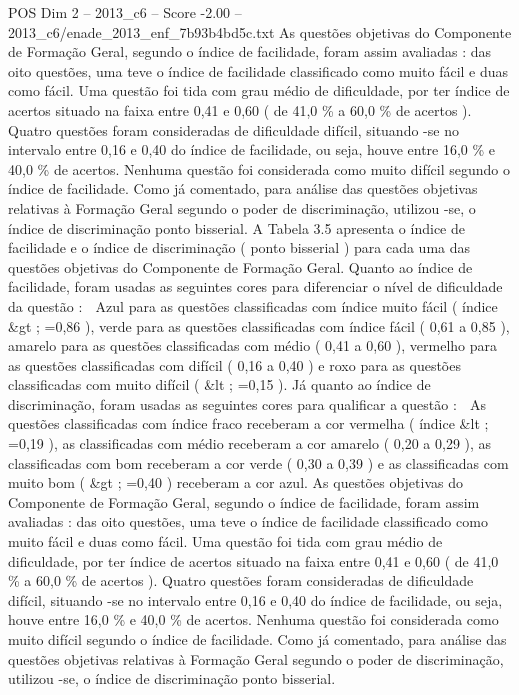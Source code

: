 \begin{textsample}{POS Dim 2 – 2013\_c6 – Score -2.00 – 2013\_c6/enade\_2013\_enf\_7b93b4bd5c.txt}
As questões objetivas do Componente de Formação Geral, segundo o índice de facilidade, foram assim avaliadas : das oito questões, uma teve o índice de facilidade classificado como muito fácil e duas como fácil.
Uma questão foi tida com grau médio de dificuldade, por ter índice de acertos situado na faixa entre 0,41 e 0,60 ( de 41,0 \% a 60,0 \% de acertos ).
Quatro questões foram consideradas de dificuldade difícil, situando -se no intervalo entre 0,16 e 0,40 do índice de facilidade, ou seja, houve entre 16,0 \% e 40,0 \% de acertos.
Nenhuma questão foi considerada como muito difícil segundo o índice de facilidade.
Como já comentado, para análise das questões objetivas relativas à Formação Geral segundo o poder de discriminação, utilizou -se, o índice de discriminação ponto bisserial.
A Tabela 3.5 apresenta o índice de facilidade e o índice de discriminação ( ponto bisserial ) para cada uma das questões objetivas do Componente de Formação Geral.
Quanto ao índice de facilidade, foram usadas as seguintes cores para diferenciar o nível de dificuldade da questão :  Azul para as questões classificadas com índice muito fácil ( índice \&gt ; =0,86 ), verde para as questões classificadas com índice fácil ( 0,61 a 0,85 ), amarelo para as questões classificadas com médio ( 0,41 a 0,60 ), vermelho para as questões classificadas com difícil ( 0,16 a 0,40 ) e roxo para as questões classificadas com muito difícil ( \&lt ; =0,15 ).
Já quanto ao índice de discriminação, foram usadas as seguintes cores para qualificar a questão :  As questões classificadas com índice fraco receberam a cor vermelha ( índice \&lt ; =0,19 ), as classificadas com médio receberam a cor amarelo ( 0,20 a 0,29 ), as classificadas com bom receberam a cor verde ( 0,30 a 0,39 ) e as classificadas com muito bom ( \&gt ; =0,40 ) receberam a cor azul.
As questões objetivas do Componente de Formação Geral, segundo o índice de facilidade, foram assim avaliadas : das oito questões, uma teve o índice de facilidade classificado como muito fácil e duas como fácil.
Uma questão foi tida com grau médio de dificuldade, por ter índice de acertos situado na faixa entre 0,41 e 0,60 ( de 41,0 \% a 60,0 \% de acertos ).
Quatro questões foram consideradas de dificuldade difícil, situando -se no intervalo entre 0,16 e 0,40 do índice de facilidade, ou seja, houve entre 16,0 \% e 40,0 \% de acertos.
Nenhuma questão foi considerada como muito difícil segundo o índice de facilidade.
Como já comentado, para análise das questões objetivas relativas à Formação Geral segundo o poder de discriminação, utilizou -se, o índice de discriminação ponto bisserial.

\end{textsample}
